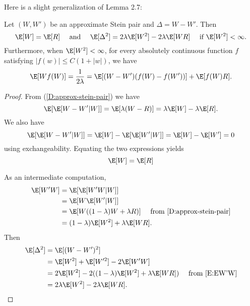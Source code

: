 Here is a slight generalization of Lemma 2.7:
\begin{lemma}
  Let $(W, W')$ be an approximate Stein pair and $\Delta = W - W'$.  Then 
  \begin{equation}
    \E [W] = \E [R] \quad \text{ and } \quad \E [\Delta^2] = 2 \lambda \E [W^2] - 2\lambda \E [WR]
    \quad \text{ if } \E [W^2] < \infty.
  \end{equation}
  Furthermore, when $\E [W^2] < \infty$, for every absolutely continuous function $f$ satisfying 
  $|f(w)| \leq C(1 + |w|)$, we have
  \begin{equation}
    \E [Wf(W)] = \frac{1}{2\lambda} = \E [(W-W')(f(W)-f(W'))] + \E [f(W)R].
  \end{equation}
\end{lemma}
\begin{proof}
  From (\ref{D:approx-stein-pair}) we have
  \begin{equation*}
    \E [\E [W-W'|W]] = \E [\lambda (W - R)] = \lambda \E [W] - \lambda \E [R].
  \end{equation*}
  We also have 
  \begin{equation*}
    \E [\E [W-W'|W]] = \E [W] - \E [\E [W' | W]] = \E [W] - \E [W'] = 0
  \end{equation*}
  using exchangeability.  Equating the two expressions yields
  \begin{equation*}
    \E [W] = \E [R]
  \end{equation*}
  
  As an intermediate computation,
  \begin{equation}
    \label{E:EW'W}
    \begin{split}
      \E [W'W] &= \E [\E [W'W|W]] \\
      &= \E [W \E [W'|W]] \\
      &= \E [W ((1-\lambda)W+\lambda R)] \quad \text{ from } \eqref{D:approx-stein-pair} \\
      &= (1-\lambda)\E [W^2] + \lambda \E [WR].
    \end{split}
  \end{equation}
  Then 
  \begin{equation}
    \begin{split}
      \E [\Delta^2] &= \E [(W-W')^2] \\
      &= \E [W^2] + \E [W'^2] - 2\E [W'W] \\
      &= 2 \E [W^2] - 2 ((1-\lambda)\E [W^2] + \lambda \E [WR]) \quad \text{ from } \eqref{E:EW'W}\\
      &= 2 \lambda \E [W^2] - 2\lambda \E [WR].
    \end{split}
  \end{equation}
  

\end{proof}
